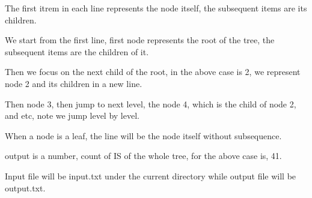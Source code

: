 \documentclass{article}
\begin{document}
The first itrem in each line represents the node itself, the subsequent items are its children.

We start from the first line, first node represents the root of the tree, the subsequent items are the children of it.

Then we focus on the next child of the root, in the above case is 2, we represent node 2 and its children in a new line.

Then node 3, then jump to next level, the node 4, which is the child of node 2, and etc, note we jump level by level. 

When a node is a leaf, the line will be the node itself without subsequence.


output is a number, count of IS of the whole tree, for the above case is, 41.

Input file will be input.txt under the current directory while output file will be output.txt.
\end{document}
